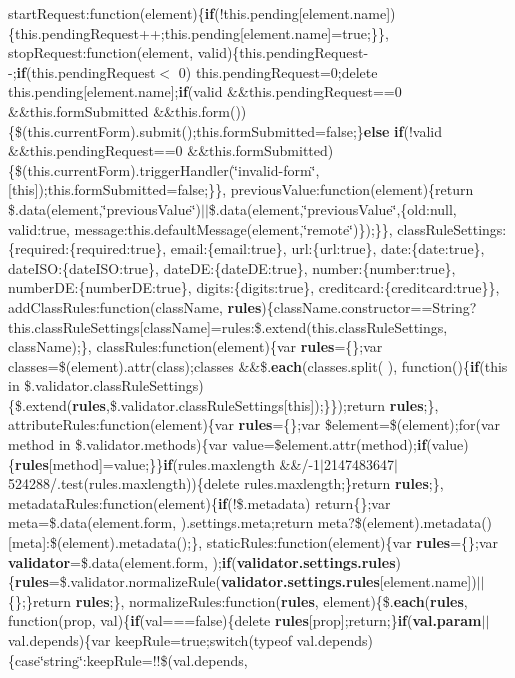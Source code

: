 {{\begin{DoxyParamCaption}
start\+Request\+:function(element)\{{\bf if}(!this.\+pending\mbox{[}element.\+name\mbox{]})\{this.\+pending\+Request++;this.\+pending\mbox{[}element.\+name\mbox{]}=true;\}\}, stop\+Request\+:function(element, valid)\{this.\+pending\+Request-\/-\/;{\bf if}(this.\+pending\+Request$<$ 0) this.\+pending\+Request=0;delete this.\+pending\mbox{[}element.\+name\mbox{]};{\bf if}(valid \&\&this.\+pending\+Request==0 \&\&this.\+form\+Submitted \&\&this.\+form())\{\$(this.\+current\+Form).submit();this.\+form\+Submitted=false;\}{\bf else} {\bf if}(!valid \&\&this.\+pending\+Request==0 \&\&this.\+form\+Submitted)\{\$(this.\+current\+Form).trigger\+Handler(\char`\"{}invalid-\/form\char`\"{}, \mbox{[}this\mbox{]});this.\+form\+Submitted=false;\}\}, previous\+Value\+:function(element)\{return \$.data(element,\char`\"{}previous\+Value\char`\"{})$\vert$$\vert$\$.data(element,\char`\"{}previous\+Value\char`\"{},\{old\+:null, valid\+:true, message\+:this.\+default\+Message(element,\char`\"{}remote\char`\"{})\});\}\}, class\+Rule\+Settings\+:\{required\+:\{required\+:true\}, email\+:\{email\+:true\}, url\+:\{url\+:true\}, date\+:\{date\+:true\}, date\+I\+S\+O\+:\{date\+I\+S\+O\+:true\}, date\+D\+E\+:\{date\+D\+E\+:true\}, number\+:\{number\+:true\}, number\+D\+E\+:\{number\+D\+E\+:true\}, digits\+:\{digits\+:true\}, creditcard\+:\{creditcard\+:true\}\}, add\+Class\+Rules\+:function(class\+Name, {\bf rules})\{class\+Name.\+constructor==String?this.\+class\+Rule\+Settings\mbox{[}class\+Name\mbox{]}=rules\+:\$.\+extend(this.\+class\+Rule\+Settings, class\+Name);\}, class\+Rules\+:function(element)\{var {\bf rules}=\{\};var classes=\$(element).attr(\textquotesingle{}class\textquotesingle{});classes \&\&\$.{\bf each}(classes.\+split(\textquotesingle{} \textquotesingle{}), function()\{{\bf if}(this in \$.validator.\+class\+Rule\+Settings)\{\$.extend({\bf rules},\$.validator.\+class\+Rule\+Settings\mbox{[}this\mbox{]});\}\});return {\bf rules};\}, attribute\+Rules\+:function(element)\{var {\bf rules}=\{\};var \$element=\$(element);for(var method in \$.validator.\+methods)\{var value=\$element.\+attr(method);{\bf if}(value)\{{\bf rules}\mbox{[}method\mbox{]}=value;\}\}{\bf if}(rules.\+maxlength \&\&/-\/1$\vert$2147483647$\vert$524288/.test(rules.\+maxlength))\{delete rules.\+maxlength;\}return {\bf rules};\}, metadata\+Rules\+:function(element)\{{\bf if}(!\$.metadata) return\{\};var meta=\$.data(element.\+form, \textquotesingle{}).settings.\+meta;return meta?\$(element).metadata()\mbox{[}meta\mbox{]}\+:\$(element).metadata();\}, static\+Rules\+:function(element)\{var {\bf rules}=\{\};var {\bf validator}=\$.data(element.\+form, \textquotesingle{});{\bf if}({\bf validator.\+settings.\+rules})\{{\bf rules}=\$.validator.\+normalize\+Rule({\bf validator.\+settings.\+rules}\mbox{[}element.\+name\mbox{]})$\vert$$\vert$\{\};\}return {\bf rules};\}, normalize\+Rules\+:function({\bf rules}, element)\{\$.{\bf each}({\bf rules}, function(prop, val)\{{\bf if}(val===false)\{delete {\bf rules}\mbox{[}prop\mbox{]};return;\}{\bf if}({\bf val.\+param}$\vert$$\vert$val.\+depends)\{var keep\+Rule=true;switch(typeof val.\+depends)\{case\char`\"{}string\char`\"{}\+:keep\+Rule=!!\$(val.\+depends, 
\end{DoxyParamCaption}}}
